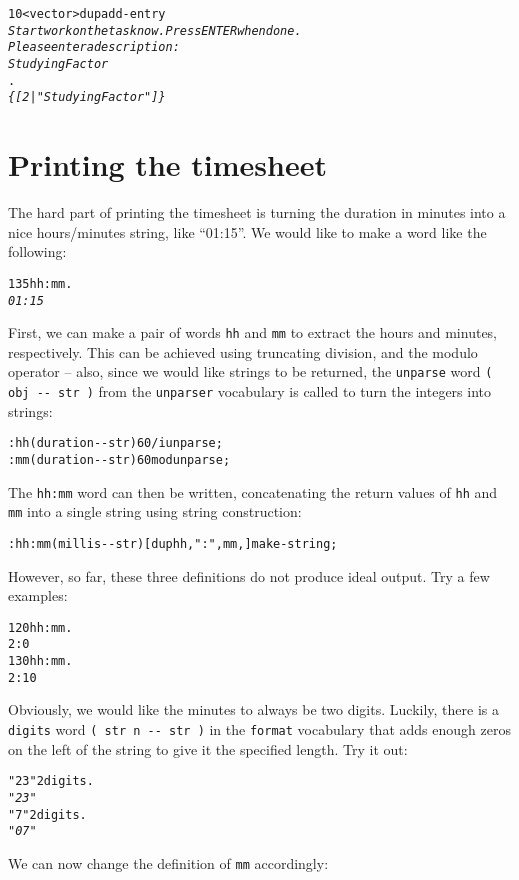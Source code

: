 \documentclass[english]{book}
\begin{document}
\begin{alltt}
10 <vector> dup add-entry
\emph{Start work on the task now. Press ENTER when done.}
\emph{Please enter a description:}
\emph{Studying Factor}
.
\emph{\{ {[} 2 | "Studying Factor" {]} \}}
\end{alltt}

\section{Printing the timesheet}

The hard part of printing the timesheet is turning the duration in
minutes into a nice hours/minutes string, like {}``01:15''. We would
like to make a word like the following:

\begin{alltt}
135 hh:mm .
\emph{01:15}
\end{alltt}

First, we can make a pair of words \texttt{hh} and \texttt{mm} to extract the hours
and minutes, respectively. This can be achieved using truncating division,
and the modulo operator -- also, since we would like strings to be
returned, the \texttt{unparse} word \texttt{( obj -{}- str )} from
the \texttt{unparser} vocabulary is called to turn the integers into
strings:

\begin{alltt}
: hh ( duration -{}- str ) 60 /i unparse ;
: mm ( duration -{}- str ) 60 mod unparse ;
\end{alltt}

The \texttt{hh:mm} word can then be written, concatenating the return
values of \texttt{hh} and \texttt{mm} into a single string using string
construction:

\begin{alltt}
: hh:mm ( millis -{}- str ) [ dup hh , ":" , mm , ] make-string ;
\end{alltt}
However, so far, these three definitions do not produce ideal output.
Try a few examples:

\begin{alltt}
120 hh:mm .
2:0
130 hh:mm .
2:10
\end{alltt}
Obviously, we would like the minutes to always be two digits. Luckily,
there is a \texttt{digits} word \texttt{( str n -{}- str )} in the
\texttt{format} vocabulary that adds enough zeros on the left of the
string to give it the specified length. Try it out:

\begin{alltt}
"23" 2 digits .
\emph{"23"}
"7"2 digits .
\emph{"07"}
\end{alltt}
We can now change the definition of \texttt{mm} accordingly:
\end{document}

